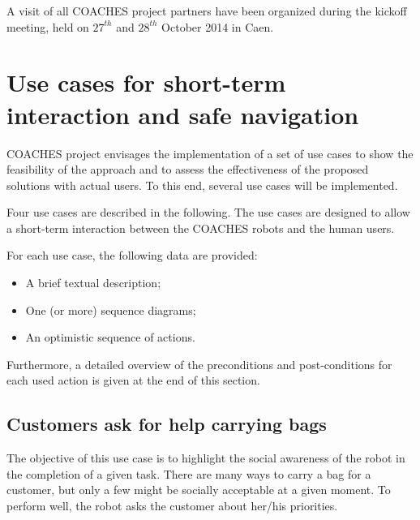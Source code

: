 A visit of all COACHES project partners have been organized during the kickoff meeting,
held on $27^{th}$ and $28^{th}$ October 2014 in Caen. 


\section{Use cases for short-term interaction and safe navigation}

COACHES project envisages the implementation of a set of use cases
to show the feasibility of the approach and to assess the effectiveness
of the proposed solutions with actual users.
To this end, several use cases will be implemented. 

Four use cases are described in the following. The use cases are designed
to allow a short-term interaction between the COACHES robots and the human users.

For each use case, the following data are provided:
\begin{itemize}
\item A brief textual description;
\item One (or more) sequence diagrams;
\item An optimistic sequence of actions.
\end{itemize}

Furthermore, a detailed overview of the preconditions and post-conditions for each used action is given at the end of this section.


\subsection{Customers ask for help carrying bags}

The objective of this use case is to highlight the social awareness
of the robot in the completion of a given task. There are many ways
to carry a bag for a customer, but only a few might be socially acceptable
at a given moment. To perform well, the robot asks the customer about her/his priorities.

